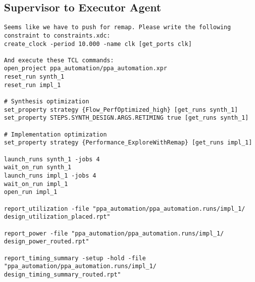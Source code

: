 \subsection{Supervisor to Executor Agent}
\vspace{-0.5em}
\begin{supervisorbox}
\begin{lstlisting}
Seems like we have to push for remap. Please write the following constraint to constraints.xdc:
create_clock -period 10.000 -name clk [get_ports clk]

And execute these TCL commands:
open_project ppa_automation/ppa_automation.xpr
reset_run synth_1
reset_run impl_1

# Synthesis optimization
set_property strategy {Flow_PerfOptimized_high} [get_runs synth_1]
set_property STEPS.SYNTH_DESIGN.ARGS.RETIMING true [get_runs synth_1]

# Implementation optimization
set_property strategy {Performance_ExploreWithRemap} [get_runs impl_1]

launch_runs synth_1 -jobs 4
wait_on_run synth_1
launch_runs impl_1 -jobs 4
wait_on_run impl_1
open_run impl_1

report_utilization -file "ppa_automation/ppa_automation.runs/impl_1/
design_utilization_placed.rpt"

report_power -file "ppa_automation/ppa_automation.runs/impl_1/
design_power_routed.rpt"

report_timing_summary -setup -hold -file "ppa_automation/ppa_automation.runs/impl_1/
design_timing_summary_routed.rpt"
\end{lstlisting}
\end{supervisorbox}


